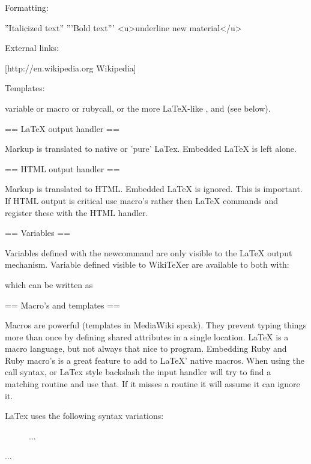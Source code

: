 Formatting:

''Italicized text''
'''Bold text'''
<u>underline new material</u>

External links:

[http://en.wikipedia.org Wikipedia]

Templates:

{{variable}} or {{macro}} or {{rubycall}}, or the more LaTeX-like
\variable, \macro and \rubycall (see below).


== LaTeX output handler ==

Markup is translated to native or 'pure' LaTex. Embedded LaTeX is left alone.


== HTML output handler ==

Markup is translated to HTML. Embedded LaTeX is ignored. This is
important. If HTML output is critical use macro's rather then LaTeX
commands and register these with the HTML handler.

== Variables ==

Variables defined with the newcommand are only visible to the LaTeX
output mechanism. Variable defined visible to WikiTeXer are available
to both with:


which can be written as


== Macro's and templates ==

Macros are powerful (templates in MediaWiki speak). They prevent
typing things more than once by defining shared attributes in a single
location.  LaTeX is a macro language, but not always that nice to
program.  Embedding Ruby and Ruby macro's is a great feature to add to
LaTeX' native macros. When using the {{call}} syntax, or LaTex style
backslash \call the input handler will try to find a matching routine
and use that. If it misses a routine it will assume it can ignore it.

LaTex uses the following syntax variations:

	\hfill
	\caption{This is the caption.\label{fig:rawss}}

  \begin{figure} ... \end{figure}
  \begin{minipage}[t]{0.58\linewidth} ... \end{minipage} %

